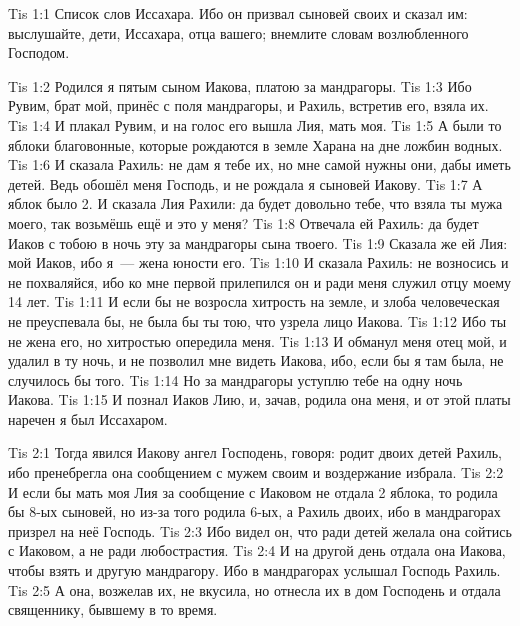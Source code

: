 \vs Tis 1:1
Список слов Иссахара.
Ибо он призвал сыновей своих и сказал им:
выслушайте, дети, Иссахара, отца вашего;
внемлите словам возлюбленного Господом.

\vs Tis 1:2
Родился я пятым сыном Иакова, платою за мандрагоры.
\vs Tis 1:3
Ибо Рувим, брат мой, принёс с поля мандрагоры,
и Рахиль, встретив его, взяла их.
\vs Tis 1:4
И плакал Рувим, и на голос его вышла Лия, мать моя.
\vs Tis 1:5
А были то яблоки благовонные, которые рождаются в земле Харана
на дне ложбин водных.
\vs Tis 1:6
И сказала Рахиль: не дам я тебе их, но мне самой нужны они,
дабы иметь детей.
Ведь обошёл меня Господь, и не рождала я сыновей Иакову.
\vs Tis 1:7
А яблок было 2.
И сказала Лия Рахили: да будет довольно тебе,
что взяла ты мужа моего, так возьмёшь ещё и это у меня?
\vs Tis 1:8
Отвечала ей Рахиль:
да будет Иаков с тобою в ночь эту за мандрагоры сына твоего.
\vs Tis 1:9
Сказала же ей Лия: мой Иаков, ибо я~--- жена юности его.
\vs Tis 1:10
И сказала Рахиль:
не возносись и не похваляйся,
ибо ко мне первой прилепился он и ради меня служил отцу моему 14 лет.
\vs Tis 1:11
И если бы не возросла хитрость на земле,
и злоба человеческая не преуспевала бы,
не была бы ты тою, что узрела лицо Иакова.
\vs Tis 1:12
Ибо ты не жена его, но хитростью опередила меня.
\vs Tis 1:13
И обманул меня отец мой, и удалил в ту ночь,
и не позволил мне видеть Иакова, ибо, если бы я там была,
не случилось бы того.
\vs Tis 1:14
Но за мандрагоры уступлю тебе на одну ночь Иакова.
\vs Tis 1:15
И познал Иаков Лию, и, зачав, родила она меня,
и от этой платы наречен я был Иссахаром.

\vs Tis 2:1
Тогда явился Иакову ангел Господень, говоря:
родит двоих детей Рахиль,
ибо пренебрегла она сообщением с мужем своим и воздержание избрала.
\vs Tis 2:2
И если бы мать моя Лия за сообщение с Иаковом не отдала 2 яблока,
то родила бы 8-ых сыновей, но из-за того родила 6-ых,
а Рахиль двоих, ибо в мандрагорах призрел на неё Господь.
\vs Tis 2:3
Ибо видел он, что ради детей желала она сойтись с Иаковом,
а не ради любострастия.
\vs Tis 2:4
И на другой день отдала она Иакова, чтобы взять и другую мандрагору.
Ибо в мандрагорах услышал Господь Рахиль.
\vs Tis 2:5
А она, возжелав их, не вкусила, но отнесла их в дом Господень
и отдала священнику, бывшему в то время.

